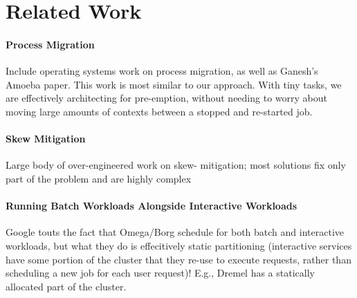 \section{Related Work}
\paragraph{Process Migration} Include operating systems work on process
migration, as well as Ganesh's Amoeba paper. This work is most similar to
our approach. With tiny tasks, we are effectively architecting for pre-emption,
without needing to worry about moving large amounts of contexts between a
stopped and re-started job.

\paragraph{Skew Mitigation} Large body of over-engineered work on skew-
mitigation; most solutions fix only part of the problem and are highly
complex

\paragraph{Running Batch Workloads Alongside Interactive Workloads}
Google touts the fact that Omega/Borg schedule for both batch and interactive
workloads, but what they do is effecitively static partitioning (interactive
services have some portion of the cluster that they re-use to execute requests,
rather than scheduling a new job for each user request)! E.g., 
Dremel has a statically allocated part of the cluster.


